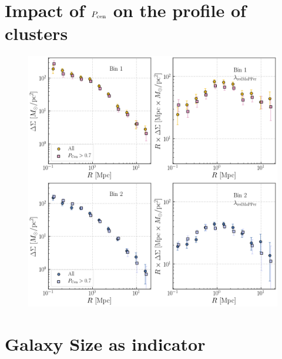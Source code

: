 \documentclass[a4paper,fleqn,usenatbib]{mnras}
\begin{document}
\section{Impact of $P_{\rm cen}$ on the \dsigma{} profile of \redm{} clusters} 
	\label{app:pcen} 
    

  \begin{figure}
      \centering 
      \includegraphics[width=12cm]{figure/redmapper_pcen_placeholder}
      \caption{
          }
      \label{fig:pcen}
  \end{figure}

\section{Galaxy Size as \mvir{} indicator} 
	\label{app:size} 
    


\bsp
\label{lastpage}
\end{document}
